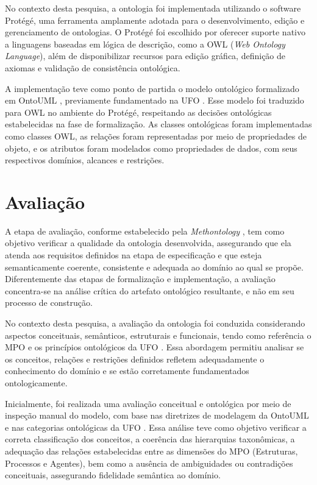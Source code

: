 No contexto desta pesquisa, a ontologia foi implementada utilizando o software Protégé, uma ferramenta amplamente adotada para o desenvolvimento, edição e gerenciamento de ontologias. O Protégé foi escolhido por oferecer suporte nativo a linguagens baseadas em lógica de descrição, como a OWL (\textit{Web Ontology Language}), além de disponibilizar recursos para edição gráfica, definição de axiomas e validação de consistência ontológica.

A implementação teve como ponto de partida o modelo ontológico formalizado em OntoUML \cite{ontouml_readthedocs}, previamente fundamentado na UFO \cite{guizzardi2008grounding}. Esse modelo foi traduzido para OWL no ambiente do Protégé, respeitando as decisões ontológicas estabelecidas na fase de formalização. As classes ontológicas foram implementadas como classes OWL, as relações foram representadas por meio de propriedades de objeto, e os atributos foram modelados como propriedades de dados, com seus respectivos domínios, alcances e restrições.

\section{Avaliação}

A etapa de avaliação, conforme estabelecido pela \textit{Methontology} \cite{fernandez1997methontology}, tem como objetivo verificar a qualidade da ontologia desenvolvida, assegurando que ela atenda aos requisitos definidos na etapa de especificação e que esteja semanticamente coerente, consistente e adequada ao domínio ao qual se propõe. Diferentemente das etapas de formalização e implementação, a avaliação concentra-se na análise crítica do artefato ontológico resultante, e não em seu processo de construção.

No contexto desta pesquisa, a avaliação da ontologia foi conduzida considerando aspectos conceituais, semânticos, estruturais e funcionais, tendo como referência o MPO \cite{vieira2022thesis} e os princípios ontológicos da UFO \cite{guizzardi2008grounding}. Essa abordagem permitiu analisar se os conceitos, relações e restrições definidos refletem adequadamente o conhecimento do domínio e se estão corretamente fundamentados ontologicamente.

Inicialmente, foi realizada uma avaliação conceitual e ontológica por meio de inspeção manual do modelo, com base nas diretrizes de modelagem da OntoUML \cite{ontouml_readthedocs} e nas categorias ontológicas da UFO \cite{guizzardi2008grounding}. Essa análise teve como objetivo verificar a correta classificação dos conceitos, a coerência das hierarquias taxonômicas, a adequação das relações estabelecidas entre as dimensões do MPO (Estruturas, Processos e Agentes), bem como a ausência de ambiguidades ou contradições conceituais, assegurando fidelidade semântica ao domínio.

